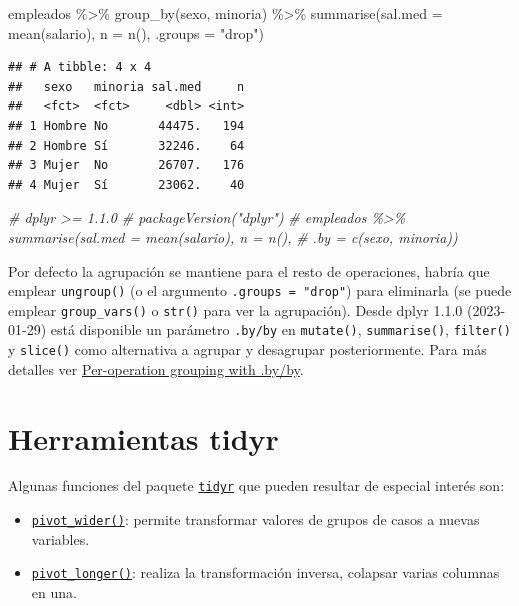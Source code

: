 \documentclass[
]{book}
\newenvironment{Shaded}{\begin{snugshade}}{\end{snugshade}}
\newcommand{\AttributeTok}[1]{\textcolor[rgb]{0.77,0.63,0.00}{#1}}
\newcommand{\CommentTok}[1]{\textcolor[rgb]{0.56,0.35,0.01}{\textit{#1}}}
\newcommand{\FunctionTok}[1]{\textcolor[rgb]{0.00,0.00,0.00}{#1}}
\newcommand{\NormalTok}[1]{#1}
\newcommand{\SpecialCharTok}[1]{\textcolor[rgb]{0.00,0.00,0.00}{#1}}
\newcommand{\StringTok}[1]{\textcolor[rgb]{0.31,0.60,0.02}{#1}}
\providecommand{\tightlist}{%
  \setlength{\itemsep}{0pt}\setlength{\parskip}{0pt}}
\theoremstyle{break}
\theoremstyle{nonumberplain}
\begin{document}
\begin{Shaded}
\begin{Highlighting}[]
\NormalTok{empleados }\SpecialCharTok{\%\textgreater{}\%} \FunctionTok{group\_by}\NormalTok{(sexo, minoria) }\SpecialCharTok{\%\textgreater{}\%} 
    \FunctionTok{summarise}\NormalTok{(}\AttributeTok{sal.med =} \FunctionTok{mean}\NormalTok{(salario), }\AttributeTok{n =} \FunctionTok{n}\NormalTok{(), }\AttributeTok{.groups =} \StringTok{"drop"}\NormalTok{)}
\end{Highlighting}
\end{Shaded}

\begin{verbatim}
## # A tibble: 4 x 4
##   sexo   minoria sal.med     n
##   <fct>  <fct>     <dbl> <int>
## 1 Hombre No       44475.   194
## 2 Hombre Sí       32246.    64
## 3 Mujer  No       26707.   176
## 4 Mujer  Sí       23062.    40
\end{verbatim}

\begin{Shaded}
\begin{Highlighting}[]
\CommentTok{\# dplyr \textgreater{}= 1.1.0 \# packageVersion("dplyr")}
\CommentTok{\# empleados \%\textgreater{}\% summarise(sal.med = mean(salario), n = n(), }
\CommentTok{\#                         .by = c(sexo, minoria))}
\end{Highlighting}
\end{Shaded}

Por defecto la agrupación se mantiene para el resto de operaciones, habría que emplear \texttt{ungroup()} (o el argumento \texttt{.groups\ =\ "drop"}) para eliminarla (se puede emplear \texttt{group\_vars()} o \texttt{str()} para ver la agrupación).
Desde dplyr 1.1.0 (2023-01-29) está disponible un parámetro \texttt{.by/by} en \texttt{mutate()}, \texttt{summarise()}, \texttt{filter()} y \texttt{slice()} como alternativa a agrupar y desagrupar posteriormente.
Para más detalles ver \href{https://dplyr.tidyverse.org/reference/dplyr_by.html}{Per-operation grouping with .by/by}.

\hypertarget{herramientas-tidyr}{%
\section{Herramientas tidyr}\label{herramientas-tidyr}}

Algunas funciones del paquete \href{https://tidyr.tidyverse.org}{\texttt{tidyr}} que pueden resultar de especial interés son:

\begin{itemize}
\tightlist
\item
  \href{https://tidyr.tidyverse.org/reference/pivot_wider.html}{\texttt{pivot\_wider()}}: permite transformar valores de grupos de casos a nuevas variables.
\item
  \href{https://tidyr.tidyverse.org/reference/pivot_longer.html}{\texttt{pivot\_longer()}}: realiza la transformación inversa, colapsar varias columnas en una.
\end{itemize}
\end{document}
